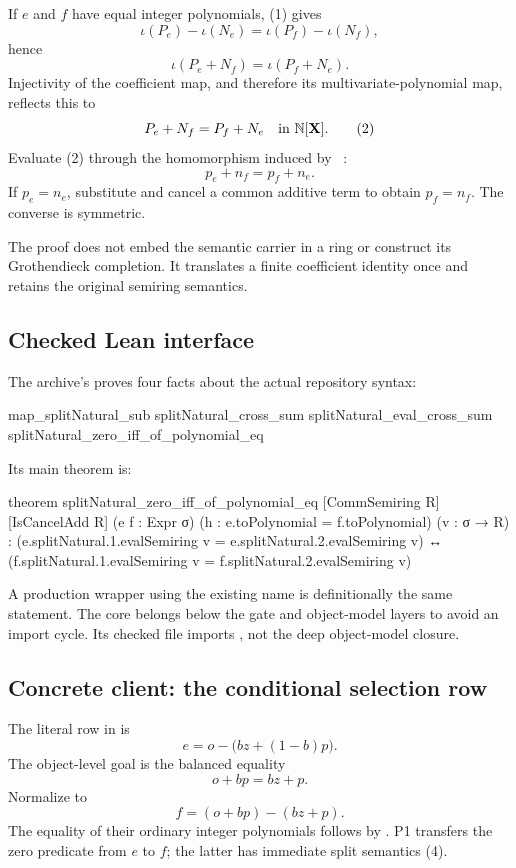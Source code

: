 If $e$ and $f$ have equal integer polynomials, (1) gives
\[
 \iota(P_e)-\iota(N_e)=\iota(P_f)-\iota(N_f),
\]
hence
\[
 \iota(P_e+N_f)=\iota(P_f+N_e).
\]
Injectivity of the coefficient map, and therefore its multivariate-polynomial
map, reflects this to
\[
             P_e+N_f=P_f+N_e\quad\text{in }\mathbb N[\mathbf X].
 \tag{2}
\]
Evaluate (2) through the homomorphism induced by ~:
\[
             p_e+n_f=p_f+n_e.
 \tag{3}
\]
If $p_e=n_e$, substitute and cancel a common additive term to obtain
$p_f=n_f$. The converse is symmetric.

The proof does not embed the semantic carrier in a ring or construct its
Grothendieck completion. It translates a finite coefficient identity once
and retains the original semiring semantics.

\subsection{Checked Lean interface}

The archive's  proves four facts about
the actual repository syntax:

\begin{Lean}
map_splitNatural_sub
splitNatural_cross_sum
splitNatural_eval_cross_sum
splitNatural_zero_iff_of_polynomial_eq
\end{Lean}

Its main theorem is:

\begin{Lean}
theorem splitNatural_zero_iff_of_polynomial_eq
    [CommSemiring R] [IsCancelAdd R]
    (e f : Expr σ)
    (h : e.toPolynomial = f.toPolynomial) (v : σ → R) :
    (e.splitNatural.1.evalSemiring v =
       e.splitNatural.2.evalSemiring v) ↔
    (f.splitNatural.1.evalSemiring v =
       f.splitNatural.2.evalSemiring v)
\end{Lean}

A production wrapper using the existing  name is
definitionally the same statement. The core belongs below the gate and
object-model layers to avoid an import cycle. Its checked file imports
, not the deep object-model closure.

\subsection{Concrete client: the conditional selection row}

The literal row in
 is
\[
       e=o-\bigl(bz+(1-b)p\bigr).
\]
The object-level goal is the balanced equality
\[
       o+bp=bz+p.
 \tag{4}
\]
Normalize to
\[
       f=(o+bp)-(bz+p).
\]
The equality of their ordinary integer polynomials follows by .
P1 transfers the zero predicate from $e$ to $f$; the latter has immediate
split semantics (4).

